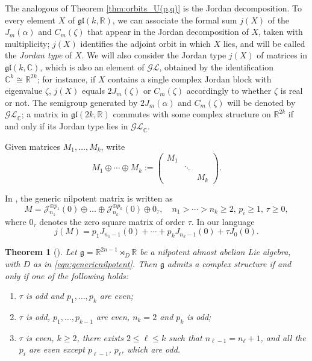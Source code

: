 \documentclass{article}
\newtheorem{theorem}{Theorem}[section]
\theoremstyle{definition}
\newcommand{\R}{\mathbb{R}}
\newcommand{\C}{\mathbb{C}}
\newcommand{\lie}[1]{\mathfrak{#1}}
\newcommand{\g}{\lie g}
\newcommand{\gl}{\lie{gl}}
\begin{document}
The analogous of Theorem \ref{thm:orbits_U(p,q)} is the Jordan decomposition. To every element $X$ of $\gl(k,\R)$, we can associate the formal sum $j(X)$ of the $J_m(\alpha)$ and $C_m(\zeta)$ that appear in the Jordan decomposition of $X$, taken with multiplicity; $j(X)$ identifies the adjoint orbit in which $X$ lies, and will be called the \emph{Jordan type} of $X$. We will also consider the Jordan type $j(X)$ of matrices in $\gl(k,\C)$, which is also an element of $\mathcal{GL}$, obtained by the identification $\C^k\cong \R^{2k}$; for instance, if $X$ contains a single complex Jordan block with eigenvalue $\zeta$, $j(X)$ equals $2J_m(\zeta)$ or $C_m(\zeta)$ accordingly to whether $\zeta$ is real or not. The semigroup generated by $2J_m(\alpha)$ and $C_m(\zeta)$ will be denoted by $\mathcal{GL}_\C$; a matrix in $\gl(2k,\R)$ commutes with some complex structure on $\R^{2k}$ if and only if its Jordan type lies in $\mathcal{GL}_\C$.\medskip

Given matrices $M_1,\dots, M_k$, write $$M_1\oplus\cdots\oplus M_k:=\begin{pmatrix}
    M_1&\\
    &\ddots\\
    &&M_k
\end{pmatrix}.$$

In \cite{ArroyoBarberisDiazGodoyHernandez}, the generic nilpotent matrix is written as \begin{equation}\label{eqn:genericnilpotent}
    M=\mathcal{J}_{n_1}^{\oplus{p_1}}(0)\oplus\dots\oplus\mathcal{J}_{n_k}^{\oplus{p_k}}(0)\oplus 0_\tau, \quad n_1>\cdots >n_k\geq 2,\, p_i\geq 1,\, \tau\geq 0,
\end{equation} where $0_\tau$ denotes the zero square matrix of order $\tau$. In our language $$j(M)=p_1J_{n_1-1}(0) + \cdots + p_kJ_{n_k-1}(0) + \tau J_0(0).$$

\begin{theorem}[{\cite[Theorem 4.10]{ArroyoBarberisDiazGodoyHernandez}}]\label{thm:AA_complex}
    Let $\g=\R^{2n-1}\rtimes_D\R$ be a nilpotent almost abelian Lie algebra, with $D$ as in \eqref{eqn:genericnilpotent}. Then $\g$ admits a complex structure if and only if one of the following holds: \begin{enumerate}
        \item $\tau$ is odd and $p_1,\dotsc, p_k$ are even;
        \item $\tau$ is odd, $p_1,\dotsc, p_{k-1}$ are even, $n_k=2$ and $p_k$ is odd;
        \item $\tau$ is even, $k\geq 2$, there exists $2\leq\ell\leq k$ such that $n_{\ell-1}=n_\ell+1$, and all the $p_i$ are even except $p_{\ell-1}$, $p_\ell$, which are odd.
    \end{enumerate}
\end{theorem}
\end{document}
